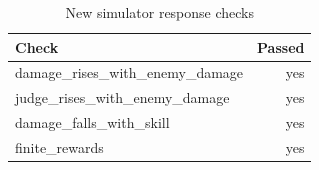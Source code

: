 \begin{table}[ht]
\centering
\small
\begin{tabular}{lr}
\toprule
Check & Passed \\
\midrule
damage\_rises\_with\_enemy\_damage & yes \\
judge\_rises\_with\_enemy\_damage & yes \\
damage\_falls\_with\_skill & yes \\
finite\_rewards & yes \\
\bottomrule
\end{tabular}
\caption{New simulator response checks}
\label{tab:sim_checks}
\end{table}

